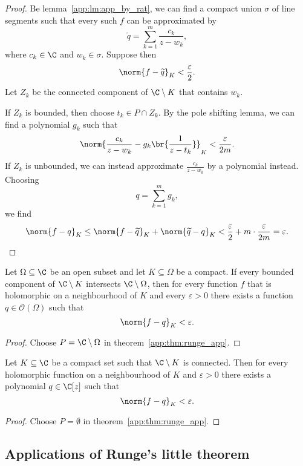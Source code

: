 \begin{proof}
Be lemma~\ref{app:lm:app_by_rat}, we can find a compact union
$\sigma$ of line segments such that every such $f$ can be
approximated by
\[
\widetilde{q} = \sum_{k=1}^m \frac{c_k}{z - w_k},
\]
where $c_k \in \C$ and $w_k \in \sigma$. Suppose then
\[
\norm{f - \widetilde{q}}_K < \frac{\varepsilon}{2}.
\]
Let $Z_k$ be the connected component of $\C \setminus K$ that
contains $w_k$.

If $Z_k$ is bounded, then choose $t_k \in P \cap Z_k$. By the pole
shifting lemma, we can find a polynomial $g_k$ such that
\[
\norm{\frac{c_k}{z - w_k} - g_k \br{\frac{1}{z - t_k}}}_K <
\frac{\varepsilon}{2m}.
\]
If $Z_k$ is unbounded, we can instead approximate
$\frac{c_k}{z - w_k}$ by a polynomial instead. Choosing
\[
q = \sum_{k=1}^m g_k,
\]
we find
\[
\norm{f - q}_K \leq
\norm{f - \widetilde{q}}_K + \norm{\widetilde{q} - q}_K <
\frac{\varepsilon}{2} + m \cdot \frac{\varepsilon}{2m} =
\varepsilon. \qedhere
\]
\end{proof}

\begin{izrek}
Let $\Omega \subseteq \C$ be an open subset and let
$K \subseteq \Omega$ be a compact. If every bounded component of
$\C \setminus K$ intersects $\C \setminus \Omega$, then for every
function $f$ that is holomorphic on a neighbourhood of $K$ and
every $\varepsilon > 0$ there exists a function
$q \in \mathcal{O}(\Omega)$ such that
\[
\norm{f - q}_K < \varepsilon.
\]
\end{izrek}

\begin{proof}
Choose $P = \C \setminus \Omega$ in
theorem~\ref{app:thm:runge_app}.
\end{proof}

\begin{posledica}
Let $K \subseteq \C$ be a compact set such that $\C \setminus K$ is
connected. Then for every holomorphic function on a neighbourhood
of $K$ and $\varepsilon > 0$ there exists a polynomial
$q \in \C[z]$ such that
\[
\norm{f - q}_K < \varepsilon.
\]
\end{posledica}

\begin{proof}
Choose $P = \emptyset$ in theorem~\ref{app:thm:runge_app}.
\end{proof}

\newpage

\subsection{Applications of Runge's little theorem}

